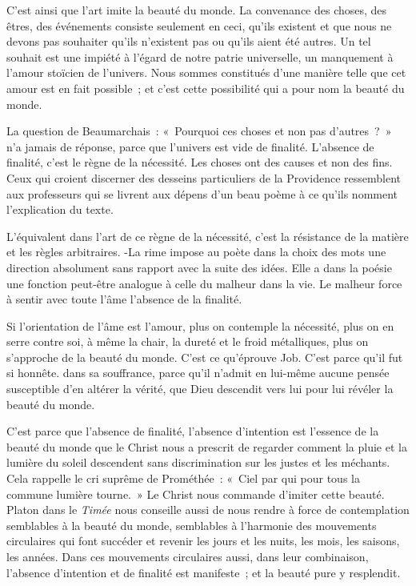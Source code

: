 \documentclass[french,twoside]{book} %
\begin{document}
C'est ainsi que l'art imite la beauté du monde. La convenance des choses, des êtres, des événements consiste seulement en ceci, qu'ils existent et que nous ne devons pas souhaiter qu'ils n'existent pas ou qu'ils aient été autres. Un tel souhait est une impiété à l'égard de notre patrie universelle, un manquement à l'amour stoïcien de l'univers. Nous sommes constitués d'une manière telle que cet amour est en fait possible ; et c'est cette possibilité qui a pour nom la beauté du monde.\par
La question de Beaumarchais : « Pourquoi ces choses et non pas d'autres ? » n'a jamais de réponse, parce que l'univers est vide de finalité. L'absence de finalité, c'est le règne de la nécessité. Les choses ont des causes et non des fins. Ceux qui croient discerner des desseins particuliers de la Providence ressemblent aux professeurs qui se livrent aux dépens d'un beau poème à ce qu'ils nomment l'explication du texte.\par
L'équivalent dans l'art de ce règne de la nécessité, c'est la résistance de la matière et les règles arbitraires. -La rime impose au poète dans la choix des mots une direction absolument sans rapport avec la suite des idées. Elle a dans la poésie une fonction peut-être analogue à celle du malheur dans la vie. Le malheur force à sentir avec toute l'âme l'absence de la finalité.\par
Si l'orientation de l'âme est l'amour, plus on contemple la nécessité, plus on en serre contre soi, à même la chair, la dureté et le froid métalliques, plus on s'approche de la beauté du monde. C'est ce qu'éprouve Job. C'est parce qu'il fut si honnête. dans sa souffrance, parce qu'il n'admit en lui-même aucune pensée susceptible d'en altérer la vérité, que Dieu descendit vers lui pour lui révéler la beauté du monde.\par
C'est parce que l'absence de finalité, l'absence d'intention est l'essence de la beauté du monde que le Christ nous a prescrit de regarder comment la pluie et la lumière du soleil descendent sans discrimination sur les justes et les méchants. Cela rappelle le cri suprême de Prométhée : « Ciel par qui pour tous la commune lumière tourne. » Le Christ nous commande d'imiter cette beauté. Platon dans le {\itshape Timée} nous conseille aussi de nous rendre à force de contemplation semblables à la beauté du monde, semblables à l'harmonie des mouvements circulaires qui font succéder et revenir les jours et les nuits, les mois, les saisons, les années. Dans ces mouvements circulaires aussi, dans leur combinaison, l'absence d'intention et de finalité est manifeste ; et la beauté pure y resplendit.\par
\end{document}
